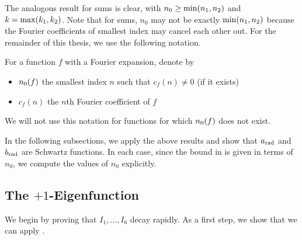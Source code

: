 The analogous result for sums is clear, with $n_0 \geq \min\!\left( n_1, n_2 \right)$ and $k = \max\!\left( k_1, k_2 \right)$. Note that for sums, $n_0$ may not be exactly $\min\!\left( n_1, n_2 \right)$ because the Fourier coefficients of smallest index may cancel each other out. For the remainder of this thesis, we use the following notation.

\begin{boxnotation}
    For a function $f$ with a Fourier expansion, denote by
    \begin{itemize}
        \item $n_0\!\left( f \right)$ the smallest index $n$ such that $c_f(n) \neq 0$ (if it exists)
        \item $c_f(n)$ the $n$th Fourier coefficient of $f$
    \end{itemize}
    We will not use this notation for functions for which $n_0\!\left( f \right)$ does not exist.
\end{boxnotation}

In the following subsections, we apply the above results and show that $a_{\operatorname{rad}}$ and $b_{\operatorname{rad}}$ are Schwartz functions. In each case, since the bound in  is given in terms of $n_0$, we compute the values of $n_0$ explicitly.

\subsection{The $+1$-Eigenfunction}
\label{Ch4:Subec:Schwartzness_a}

We begin by proving that $I_1, \ldots, I_6$ decay rapidly. As a first step, we show that we can apply .

